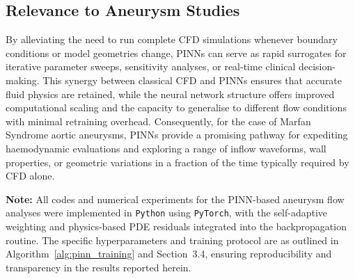 \documentclass[12pt, a4paper]{article}
\begin{document}
\subsection{Relevance to Aneurysm Studies}
By alleviating the need to run complete CFD simulations whenever boundary conditions or model geometries change, PINNs can serve as rapid surrogates for iterative parameter sweeps, sensitivity analyses, or real-time clinical decision-making. This synergy between classical CFD and PINNs ensures that accurate fluid physics are retained, while the neural network structure offers improved computational scaling and the capacity to generalise to different flow conditions with minimal retraining overhead. Consequently, for the case of Marfan Syndrome aortic aneurysms, PINNs provide a promising pathway for expediting haemodynamic evaluations and exploring a range of inflow waveforms, wall properties, or geometric variations in a fraction of the time typically required by CFD alone.

\vspace{2em}
\noindent\textbf{Note:} All codes and numerical experiments for the PINN-based aneurysm flow analyses were implemented in \texttt{Python} using \texttt{PyTorch}, with the self-adaptive weighting and physics-based PDE residuals integrated into the backpropagation routine. The specific hyperparameters and training protocol are as outlined in Algorithm~\ref{alg:pinn_training} and Section~3.4, ensuring reproducibility and transparency in the results reported herein.



\end{document}
